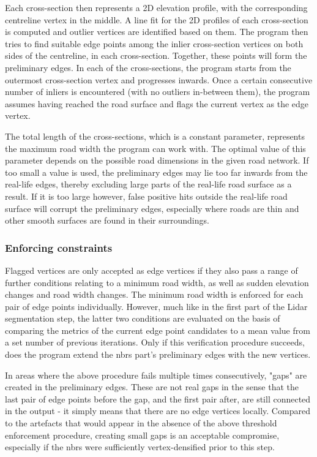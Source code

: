 Each cross-section then represents a 2D elevation profile, with the corresponding centreline vertex in the middle. A line fit for the 2D profiles of each cross-section is computed and outlier vertices are identified based on them. The program then tries to find suitable edge points among the inlier cross-section vertices on both sides of the centreline, in each cross-section. Together, these points will form the preliminary edges. In each of the cross-sections, the program starts from the outermost cross-section vertex and progresses inwards. Once a certain consecutive number of inliers is encountered (with no outliers in-between them), the program assumes having reached the road surface and flags the current vertex as the edge vertex.

The total length of the cross-sections, which is a constant parameter, represents the maximum road width the program can work with. The optimal value of this parameter depends on the possible road dimensions in the given road network. If too small a value is used, the preliminary edges may lie too far inwards from the real-life edges, thereby excluding large parts of the real-life road surface as a result. If it is too large however, false positive hits outside the real-life road surface will corrupt the preliminary edges, especially where roads are thin and other smooth surfaces are found in their surroundings.

\subsubsection{Enforcing constraints}

Flagged vertices are only accepted as edge vertices if they also pass a range of further conditions relating to a minimum road width, as well as sudden elevation changes and road width changes. The minimum road width is enforced for each pair of edge points individually. However, much like in the first part of the Lidar segmentation step, the latter two conditions are evaluated on the basis of comparing the metrics of the current edge point candidates to a mean value from a set number of previous iterations. Only if this verification procedure succeeds, does the program extend the \ac{nbrs} part's preliminary edges with the new vertices.

In areas where the above procedure fails multiple times consecutively, "gaps" are created in the preliminary edges. These are not real gaps in the sense that the last pair of edge points before the gap, and the first pair after, are still connected in the output - it simply means that there are no edge vertices locally. Compared to the artefacts that would appear in the absence of the above threshold enforcement procedure, creating small gaps is an acceptable compromise, especially if the \ac{nbrs} were sufficiently vertex-densified prior to this step.

